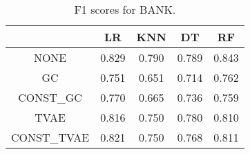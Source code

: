 \begin{table}
\caption{F1 scores for BANK.}
\label{tab:f1-BANK}
\begin{tabular}{ccccc}
\toprule
 & LR & KNN & DT & RF \\
\midrule
NONE & 0.829 & 0.790 & 0.789 & 0.843 \\
GC & 0.751 & 0.651 & 0.714 & 0.762 \\
CONST\_GC & 0.770 & 0.665 & 0.736 & 0.759 \\
TVAE & 0.816 & 0.750 & 0.780 & 0.810 \\
CONST\_TVAE & 0.821 & 0.750 & 0.768 & 0.811 \\
\bottomrule
\end{tabular}
\end{table}
